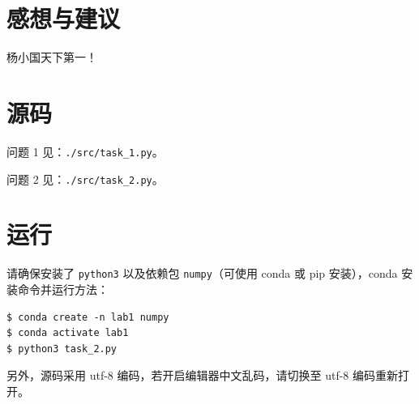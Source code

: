 \documentclass{article}
\begin{document}
\newpage

\section{感想与建议}

杨小国天下第一！

\section{源码}

问题 1 见：\lstinline{./src/task_1.py}。

问题 2 见：\lstinline{./src/task_2.py}。

\section{运行}

请确保安装了 \lstinline{python3} 以及依赖包 \lstinline{numpy}（可使用 conda 或 pip 安装），conda 安装命令并运行方法：
\begin{lstlisting}
$ conda create -n lab1 numpy
$ conda activate lab1
$ python3 task_2.py
\end{lstlisting}

另外，源码采用 utf-8 编码，若开启编辑器中文乱码，请切换至 utf-8 编码重新打开。
\end{document}
